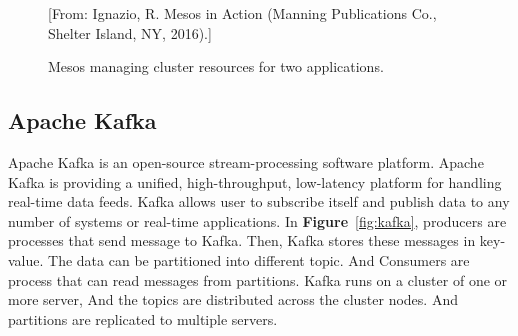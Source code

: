 \documentclass[12pt,oneside,openright,a4paper]{cpe-english-project}
\begin{document}
\begin{figure}[!h]\centering
  \setlength{\fboxrule}{0mm} %
  \setlength{\fboxsep}{0cm}
  \caption{Mesos managing cluster resources for two applications.}\label{fig:spark}
  [From: Ignazio, R. Mesos in Action (Manning Publications Co., Shelter Island, NY, 2016).]
\end{figure}

\newpage

\subsection{Apache Kafka}
Apache Kafka is an open-source stream-processing software platform. Apache Kafka is providing a unified, high-throughput, low-latency platform for handling real-time data feeds. Kafka allows user to subscribe itself and publish data to any number of systems or real-time applications. In \textbf{Figure}~\ref{fig:kafka}, producers are processes that send message to Kafka. Then, Kafka stores these messages in key-value. The data can be partitioned into different topic. And Consumers are process that can read messages from partitions. Kafka runs on a cluster of one or more server, And the topics are distributed across the cluster nodes. And partitions are replicated to multiple servers.\cite{kafka}
\end{document}
